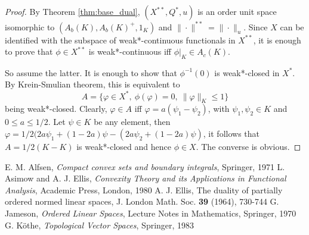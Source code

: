 \documentclass[12pt]{article}
\theoremstyle{remark}
\newcommand{\<}{\langle}
\begin{document}
\begin{proof}  By Theorem \ref{thm:base_dual}, $(X^{**},Q^*,u)$ is an order unit space  isomorphic to $(A_b(K),A_b(K)^+,1_K)$
 and $\|\cdot\|^{**}=\|\cdot\|_u$. Since $X$ can be identified with the subspace of weak*-continuous functionals in $X^{**}$, it is enough to prove that $\phi\in X^{**}$ is weak*-continuous iff $\phi|_K\in A_c(K)$. 

So assume the latter. It is enough to show that $\phi^{-1}(0)$ is weak*-closed in $X^*$. By Krein-Smulian theorem, this is equivalent to 
\[
A=\{\varphi\in X^*,\ \phi(\varphi)=0,\ \|\varphi\|_K\le 1\}
\]
being weak*-closed. Clearly, $\varphi\in A$ iff $\varphi=a(\psi_1-\psi_2)$, with $\psi_1,\psi_2\in K$ and $0\le a\le 1/2$. Let $\psi\in K$ be any element, then $\varphi= 1/2(2a\psi_1+(1-2a)\psi -(2a\psi_2+(1-2a)\psi)$, it follows that $A=1/2(K-K)$ 
 is weak*-closed and hence $\phi\in X$. The converse is obvious.


\end{proof}




\begin{thebibliography}{99}
 E. M. Alfsen, \emph{Compact convex sets and boundary integrals}, Springer, 1971
 L. Asimow and A. J. Ellis, \emph{ Convexity Theory and its Applications in Functional Analysis}, Academic Press, London, 1980
 A. J. Ellis, The duality of partially ordered normed linear spaces, J. London Math. Soc. \textbf{39} (1964), 730-744
G. Jameson, \emph{Ordered Linear Spaces}, Lecture Notes in Mathematics, Springer, 1970
 G. K\" othe, \emph{Topological Vector Spaces}, Springer, 1983
\end{thebibliography}
\end{document}
